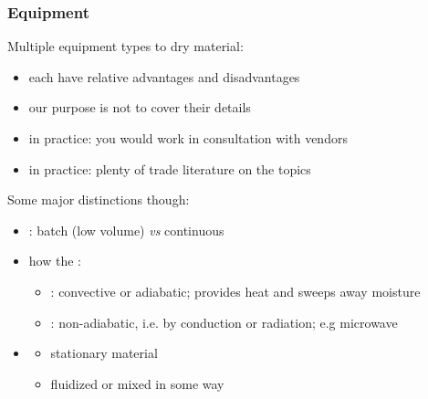 \begin{frame}\frametitle{Equipment}
	Multiple equipment types to dry material:
	\begin{itemize}
		\item	each have relative advantages and disadvantages
		\item	our purpose is not to cover their details
		\item	in practice: you would work in consultation with vendors
		\item	in practice: plenty of trade literature on the topics {}
	\end{itemize}
	\vspace{12pt}
	Some major distinctions though:
	\begin{itemize}
		\item	\textbf{{\color{myGreen}{mode of operation}}}: batch (low volume) \emph{vs} continuous
		\item	how the \textbf{{\color{myGreen}{heat is provided}}}:
		\begin{itemize}
			\item	{\color{purple}{direct heat}}: convective or adiabatic; provides heat and sweeps away moisture
			\item	{\color{purple}{indirect heat}}: non-adiabatic, i.e. by conduction or radiation; e.g microwave
		\end{itemize}
		\item	\textbf{{\color{myGreen}{degree of agitation}}}
		\begin{itemize}
			\item	stationary material
			\item	fluidized or mixed in some way
		\end{itemize}
	\end{itemize}
\end{frame}

